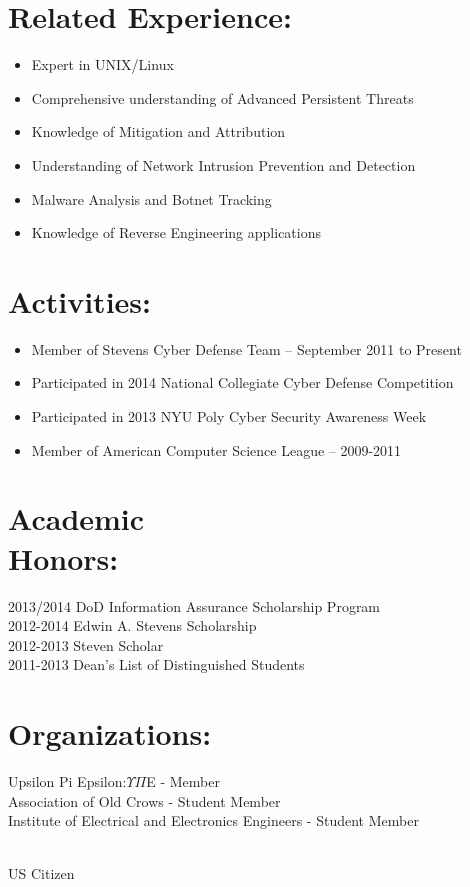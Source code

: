 \documentclass[mm]{res}
\begin{document}
\begin{resume}
\section{Related Experience:}
\begin{itemize} \itemsep -2pt %
\item Expert in UNIX/Linux
\item Comprehensive understanding of Advanced Persistent Threats
\item Knowledge of Mitigation and Attribution
\item Understanding of Network Intrusion Prevention and Detection
\item Malware Analysis and Botnet Tracking
\item Knowledge of Reverse Engineering applications
\end{itemize}

\section{Activities:}
\begin{itemize} \itemsep -2pt
\item Member of Stevens Cyber Defense Team – September 2011 to Present
\item Participated in 2014 National Collegiate Cyber Defense  Competition
\item Participated in 2013 NYU Poly Cyber Security Awareness Week
\item Member of American Computer Science League – 2009-2011
\end{itemize}

\section{Academic \\ Honors:} 
2013/2014 DoD Information Assurance Scholarship Program \\
2012-2014 Edwin A. Stevens Scholarship  \\
2012-2013 Steven Scholar \\
2011-2013 Dean's List of Distinguished Students

\section{Organizations:}
Upsilon Pi Epsilon:$\Upsilon$$\Pi$E - Member \\
Association of Old Crows - Student Member \\ 
Institute of Electrical and Electronics Engineers - Student Member\\

\end{resume} 
\centerline{\\ US Citizen}
\end{document}
